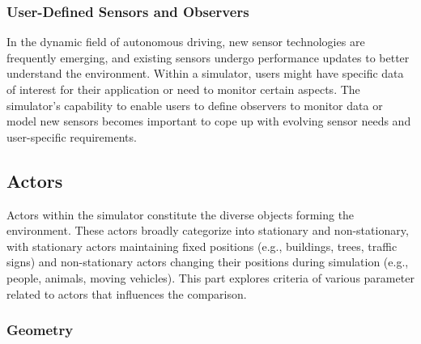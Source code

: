 \documentclass[12pt,twoside,a4paper,parskip]{scrbook} %
\begin{document}
\subsubsection{User-Defined Sensors and Observers}
In the dynamic field of autonomous driving, new sensor technologies are frequently emerging, and existing sensors undergo performance updates to better understand the environment. Within a simulator, users might have specific data of interest for their application or need to monitor certain aspects. The simulator's capability to enable users to define observers to monitor data or model new sensors becomes important to cope up with evolving sensor needs and user-specific requirements.

\subsection{Actors}
Actors within the simulator constitute the diverse objects forming the environment. These actors broadly categorize into stationary and non-stationary, with stationary actors maintaining fixed positions (e.g., buildings, trees, traffic signs) and non-stationary actors changing their positions during simulation (e.g., people, animals, moving vehicles). This part explores criteria of various parameter related to actors that influences the comparison. 
\subsubsection{Geometry}
\end{document}
